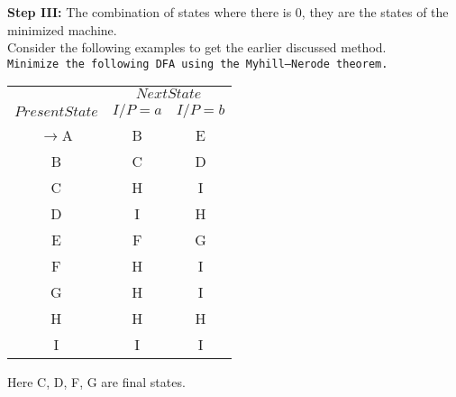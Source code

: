 \documentclass[8pt]{beamer}
\begin{document}
\begin{frame}
\textbf{Step III:} The combination of states where there is 0, they are the states of the minimized machine.\\

\vspace*{0.1cm}
Consider the following examples to get the earlier discussed method.\\

\vspace*{0.1cm}
 \hspace*{0.1cm} \texttt{Minimize the following DFA using the Myhill–Nerode theorem.}

\pause
\small{
\begin{center}
\begin{tabular}{ccc}
 \hline

 \hline

 \hline

 \hline
 & \multicolumn{2}{c}{$Next State$}\\
 \cline{2-3}
 $Present State$ &  $I/P=a$ & $I/P=b$\\
\hline
$\rightarrow$A& B& E \\
           B &C& D \\
           C &H& I \\
           D &I& H \\
           E &F& G \\
           F &H& I \\
           G &H& I \\
           H &H& H \\
           I &I& I \\
 \hline

 \hline

 \hline

 \hline
\end{tabular}
\end{center}
Here C, D, F, G are final states.\\
}
\end{frame}
\end{document}
